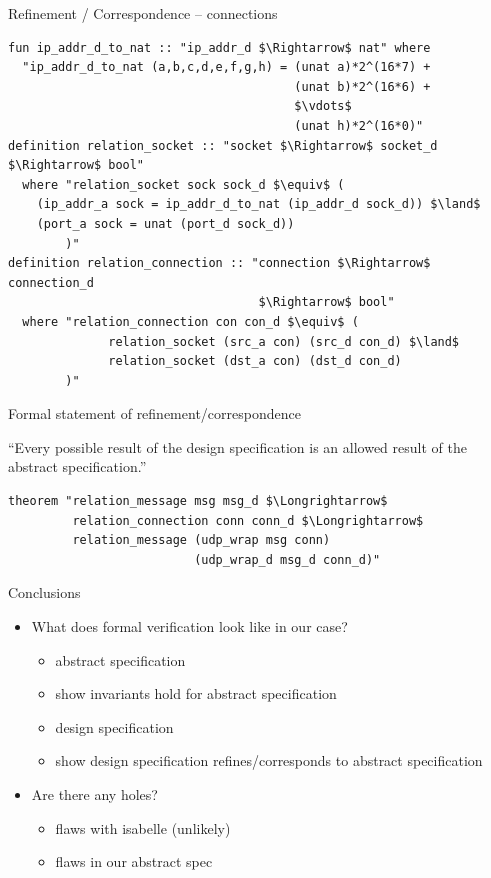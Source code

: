 \documentclass{beamer}
\begin{document}
\begin{frame}[fragile]{Refinement / Correspondence -- connections}
    \begin{lstlisting}[language=isabelle]
fun ip_addr_d_to_nat :: "ip_addr_d $\Rightarrow$ nat" where
  "ip_addr_d_to_nat (a,b,c,d,e,f,g,h) = (unat a)*2^(16*7) +
                                        (unat b)*2^(16*6) +
                                        $\vdots$
                                        (unat h)*2^(16*0)"
definition relation_socket :: "socket $\Rightarrow$ socket_d $\Rightarrow$ bool"
  where "relation_socket sock sock_d $\equiv$ (
    (ip_addr_a sock = ip_addr_d_to_nat (ip_addr_d sock_d)) $\land$
    (port_a sock = unat (port_d sock_d))
        )"
definition relation_connection :: "connection $\Rightarrow$ connection_d
                                   $\Rightarrow$ bool"
  where "relation_connection con con_d $\equiv$ (
              relation_socket (src_a con) (src_d con_d) $\land$
              relation_socket (dst_a con) (dst_d con_d)
        )"
    \end{lstlisting}
\end{frame}

\begin{frame}[fragile]{Formal statement of refinement/correspondence}

``Every possible result of the design specification is an allowed result of the abstract specification.''

    \begin{lstlisting}[language=isabelle]
theorem "relation_message msg msg_d $\Longrightarrow$
         relation_connection conn conn_d $\Longrightarrow$
         relation_message (udp_wrap msg conn)
                          (udp_wrap_d msg_d conn_d)"
    \end{lstlisting}
\end{frame}

\begin{frame}{Conclusions}
    \begin{itemize}
        \item What does formal verification look like in our case?
        \begin{itemize}
            \item abstract specification
            \item show invariants hold for abstract specification
            \item design specification
            \item show design specification refines/corresponds to abstract specification
        \end{itemize}
        \item Are there any holes?
        \begin{itemize}
            \item flaws with isabelle (unlikely)
            \item flaws in our abstract spec
        \end{itemize}
    \end{itemize}
\end{frame}
\end{document}
